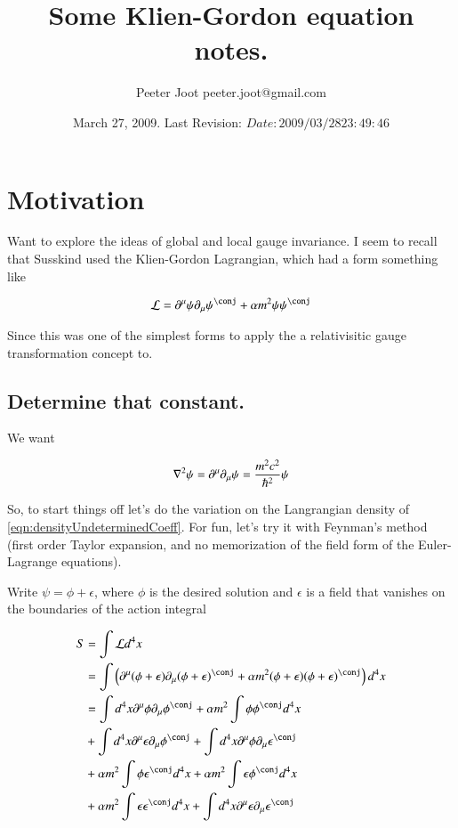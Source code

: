 \documentclass{article}
\title{ Some Klien-Gordon equation notes. }
\author{Peeter Joot \quad peeter.joot@gmail.com }
\date{ March 27, 2009.  Last Revision: $Date: 2009/03/28 23:49:46 $ }
\begin{document}
\maketitle{}
\tableofcontents
\section{ Motivation }

Want to explore the ideas of global and local gauge invariance.  I seem to recall that Susskind
used the Klien-Gordon Lagrangian, which had a form something like

\begin{align}\label{eqn:densityUndeterminedCoeff}
\LL = \partial^\mu \psi \partial_\mu \psi^\conj + \alpha m^2 \psi \psi^\conj
\end{align}

Since this was one of the simplest forms to apply the 
a relativisitic gauge transformation concept to.

\subsection{ Determine that constant. }

We want

\begin{align*}
\nabla^2 \psi = \partial^\mu \partial_\mu \psi = \frac{m^2 c^2}{\hbar^2} \psi
\end{align*}

So, to start things off let's do the variation on the Langrangian density of \ref{eqn:densityUndeterminedCoeff}.  For fun, let's try it with Feynman's method (first order Taylor expansion, and no memorization
of the field form of the Euler-Lagrange equations).

Write $\psi = \phi + \epsilon$, where $\phi$ is the desired solution and $\epsilon$ is a field that
vanishes on the boundaries of the action integral

\begin{align*}
S 
&= \int \LL d^4 x \\
&= 
\int \left( \partial^\mu (\phi + \epsilon) \partial_\mu (\phi + \epsilon)^\conj + \alpha m^2 (\phi + \epsilon) (\phi + \epsilon)^\conj \right) d^4 x \\
&= 
\int d^4 x \partial^\mu \phi \partial_\mu \phi^\conj 
+ \alpha m^2 \int \phi \phi^\conj  d^4 x \\
&+ \int d^4 x \partial^\mu \epsilon \partial_\mu \phi^\conj 
+ \int d^4 x \partial^\mu \phi \partial_\mu \epsilon^\conj  \\
&+ \alpha m^2 \int \phi \epsilon^\conj  d^4 x
+ \alpha m^2 \int \epsilon \phi^\conj  d^4 x \\
&+ \alpha m^2 \int \epsilon \epsilon^\conj  d^4 x
+ \int d^4 x \partial^\mu \epsilon \partial_\mu \epsilon^\conj \\
\end{align*}
\end{document}
